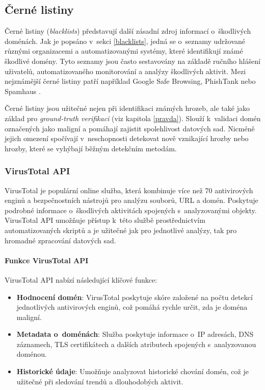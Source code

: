 \subsection{Černé listiny}
Černé listiny (\emph{blacklists}) představují další zásadní zdroj informací o~škodlivých doménách. Jak je popsáno v~sekci \ref{blacklists}, jedná se o~seznamy udržované různými organizacemi a automatizovanými systémy, které identifikují známé škodlivé domény. Tyto seznamy jsou často sestavovány na základě ručního hlášení uživatelů, automatizovaného monitorování a analýzy škodlivých aktivit. Mezi nejznámější černé listiny patří například Google Safe Browsing, PhishTank nebo Spamhaus \cite{provos-etal, moore-clayton, thomas2015ad}.

Černé listiny jsou užitečné nejen při identifikaci známých hrozeb, ale také jako základ pro \emph{ground-truth verifikaci} (viz kapitola \ref{pravda}). Slouží k~validaci domén označených jako maligní a pomáhají zajistit spolehlivost datových sad. Nicméně jejich omezení spočívají v~neschopnosti detekovat nově vznikající hrozby nebo hrozby, které se vyhýbají běžným detekčním metodám.


\subsubsection{VirusTotal API}
VirusTotal je populární online služba, která kombinuje více než 70 antivirových enginů a bezpečnostních nástrojů pro analýzu souborů, URL a domén. Poskytuje podrobné informace o~škodlivých aktivitách spojených s~analyzovanými objekty. VirusTotal API umožňuje přístup k~této službě prostřednictvím automatizovaných skriptů a je užitečné jak pro jednotlivé analýzy, tak pro hromadné zpracování datových sad. \cite{virtotal}

\paragraph{Funkce VirusTotal API}
VirusTotal API nabízí následující klíčové funkce: \cite{virtotal}
\begin{itemize}
    \item \textbf{Hodnocení domén}: VirusTotal poskytuje skóre založené na počtu detekcí jednotlivých antivirových enginů, což pomáhá rychle určit, zda je doména maligní.
    \item \textbf{Metadata o~doménách}: Služba poskytuje informace o~IP adresách, DNS záznamech, TLS certifikátech a dalších atributech spojených s~analyzovanou doménou.
    \item \textbf{Historické údaje}: Umožňuje analyzovat historické chování domén, což je užitečné při sledování trendů a dlouhodobých aktivit.
\end{itemize}

